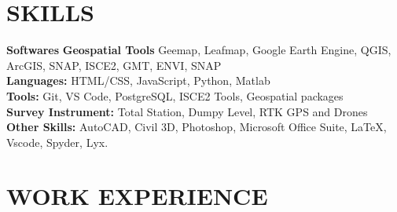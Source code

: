 \documentclass[a4paper,10pt]{article}
\begin{document}
\section*{SKILLS}
\textbf{Softwares}
\textbf{Geospatial Tools} Geemap, Leafmap, Google Earth Engine, QGIS, ArcGIS, 
SNAP, ISCE2, GMT, ENVI, SNAP\\
\textbf{Languages:}  HTML/CSS, JavaScript, Python, Matlab\\
\textbf{Tools:} Git, VS Code, PostgreSQL, ISCE2 Tools, Geospatial packages\\
\textbf{Survey Instrument:} Total Station, Dumpy Level, RTK GPS and Drones\\
\textbf{Other Skills:} AutoCAD, Civil 3D, Photoshop, Microsoft Office Suite, LaTeX, Vscode, Spyder, Lyx.


\section*{WORK EXPERIENCE}
\end{document}
